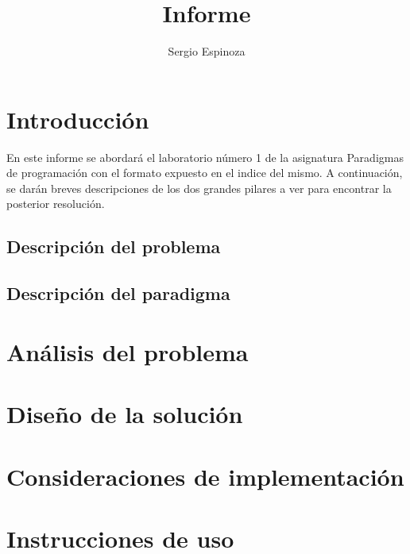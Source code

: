 \documentclass[10pt,letterpaper,openany]{article}
\title{Informe}
\author{Sergio Espinoza}
\begin{document}
    
    
    \tableofcontents
    \listoftables
    \newpage


    
    \section{Introducción}
    En este informe se abordará el laboratorio número 1 de la asignatura Paradigmas de programación
    con el formato expuesto en el indice del mismo. A continuación, se darán breves descripciones
    de los dos grandes pilares a ver para encontrar la posterior resolución.  
        \subsection{Descripción del problema}
            
        \subsection{Descripción del paradigma}
            


    \section{Análisis del problema}
        

    \section{Diseño de la solución}
        

    \section{Consideraciones de implementación}
        

    \section{Instrucciones de uso}
        
\end{document}
